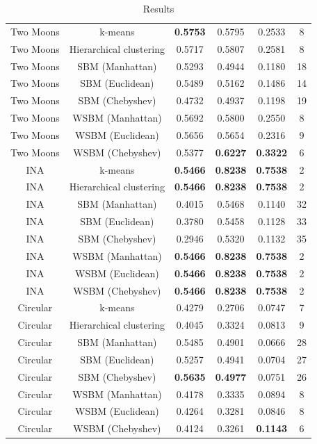 \documentclass[conference]{IEEEtran}
\begin{document}
\begin{table}[t]
\begin{tabular}{c | c | c c c | c}
    \hline
    Two Moons & k-means & \textbf{0.5753} & 0.5795 & 0.2533 & 8 \\
    Two Moons & Hierarchical clustering & 0.5717 & 0.5807 & 0.2581 & 8 \\
    Two Moons & SBM (Manhattan) & 0.5293 & 0.4944 & 0.1180 & 18 \\
    Two Moons & SBM (Euclidean) & 0.5489 & 0.5162 & 0.1486 & 14 \\
    Two Moons & SBM (Chebyshev) & 0.4732 & 0.4937 & 0.1198 & 19 \\
    Two Moons & WSBM (Manhattan) & 0.5692 & 0.5800 & 0.2550 & 8 \\
    Two Moons & WSBM (Euclidean) & 0.5656 & 0.5654 & 0.2316 & 9 \\
    Two Moons & WSBM (Chebyshev) & 0.5377 & \textbf{0.6227} & \textbf{0.3322} & 6 \\
    \hline
    INA & k-means & \textbf{0.5466} & \textbf{0.8238} & \textbf{0.7538} & 2 \\
    INA & Hierarchical clustering  & \textbf{0.5466} & \textbf{0.8238} & \textbf{0.7538} & 2 \\
    INA & SBM (Manhattan) & 0.4015 & 0.5468 & 0.1140 & 32 \\
    INA & SBM (Euclidean) & 0.3780 & 0.5458 & 0.1128 & 33 \\
    INA & SBM (Chebyshev) & 0.2946 & 0.5320 & 0.1132 & 35 \\
    INA & WSBM (Manhattan)  & \textbf{0.5466} & \textbf{0.8238} & \textbf{0.7538} & 2 \\
    INA & WSBM (Euclidean)  & \textbf{0.5466} & \textbf{0.8238} & \textbf{0.7538} & 2 \\
    INA & WSBM (Chebyshev)  & \textbf{0.5466} & \textbf{0.8238} & \textbf{0.7538} & 2 \\

    \hline
    Circular & k-means & 0.4279 & 0.2706 & 0.0747 & 7 \\
    Circular & Hierarchical clustering & 0.4045 & 0.3324 & 0.0813 & 9 \\
    Circular & SBM (Manhattan) & 0.5485 & 0.4901 & 0.0666 & 28 \\
    Circular & SBM (Euclidean) & 0.5257 & 0.4941 & 0.0704 & 27 \\
    Circular & SBM (Chebyshev) & \textbf{0.5635} & \textbf{0.4977} & 0.0751 & 26 \\
    Circular & WSBM (Manhattan) & 0.4178 & 0.3335 & 0.0894 & 8 \\
    Circular & WSBM (Euclidean) & 0.4264 & 0.3281 & 0.0846 & 8 \\
    Circular & WSBM (Chebyshev) & 0.4124 & 0.3261 & \textbf{0.1143} & 6 \\


  \end{tabular}
  \caption{Results}
  \label{tab:results_full}
\end{table}
\end{document}
